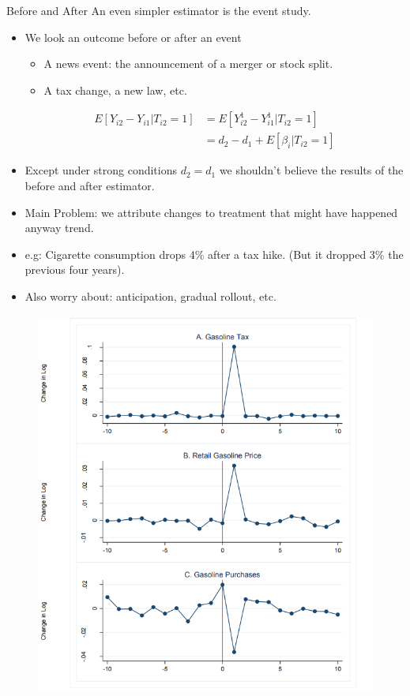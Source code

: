 \begin{frame}{Before and After} 
An even simpler estimator is the \alert{event study}.
\begin{itemize}
\item We look an outcome before or after an event
\begin{itemize}
\item A news event: the announcement of a merger or stock split.
\item A tax change, a new law, etc.
\end{itemize}
\begin{align*}
E[Y_{i2} - Y_{i1} | T_{i2}=1] & = E[Y_{i2}^1 - Y_{i1}^1 | T_{i2}=1] \\
 &= d_2-d_1 + E[\beta_{i}| T_{i2}=1] 
\end{align*}
\item Except under strong conditions $d_2 = d_1$ we shouldn't believe the results of the before and after estimator.
\item Main Problem: we attribute changes to treatment that might have happened anyway \alert{trend}.
\item e.g: Cigarette consumption drops 4\% after a tax hike. (But it dropped 3\% the previous four years).
\item Also worry about: \alert{anticipation}, \alert{gradual rollout}, etc.
\end{itemize}
\end{frame}

\begin{frame}
  \vspace{-10pt}
  \begin{figure}
  \centering
  \includegraphics[scale=0.4]{./resources/gasTaxes}
  \end{figure}
\end{frame}


